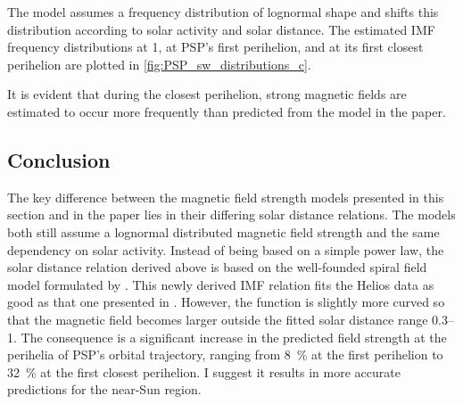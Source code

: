 The model assumes a frequency distribution of lognormal shape and shifts this distribution according to solar activity and solar distance. The estimated IMF frequency distributions at \SI{1}{\au}, at PSP's first perihelion, and at its first closest perihelion are plotted in \autoref{fig:PSP_sw_distributions_c}.
\begin{figure}[htb]
\end{figure}
It is evident that during the closest perihelion, strong magnetic fields are estimated to occur more frequently than predicted from the model in the paper.

\subsection{Conclusion}
The key difference between the magnetic field strength models presented in this section and in the paper lies in their differing solar distance relations. The models both still assume a lognormal distributed magnetic field strength and the same dependency on solar activity. Instead of being based on a simple power law, the solar distance relation derived above is based on the well-founded spiral field model formulated by \citet{Parker1958}. This newly derived IMF relation fits the Helios data as good as that one presented in \citet{Venzmer2018}. However, the function is slightly more curved so that the magnetic field becomes larger outside the fitted solar distance range \SIrange{0.3}{1}{\au}. The consequence is a significant increase in the predicted field strength at the perihelia of PSP's orbital trajectory, ranging from \SI{8}{\%} at the first perihelion to \SI{32}{\%} at the first closest perihelion. I suggest it results in more accurate predictions for the near-Sun region.

